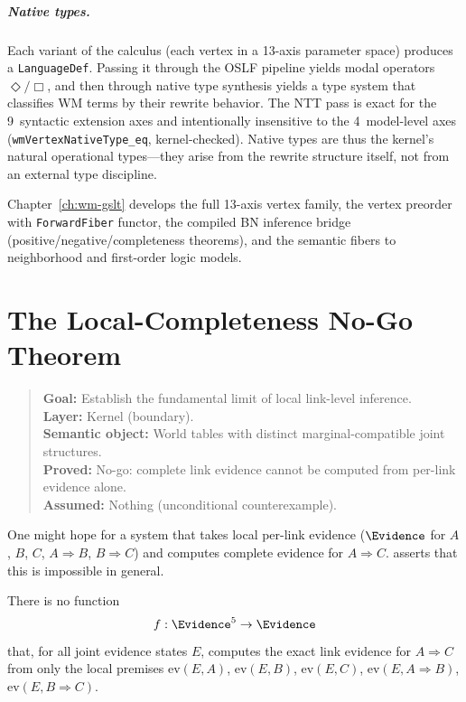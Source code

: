 \documentclass[11pt,openany]{report}
\begin{document}
\paragraph{Native types.}
Each variant of the calculus (each vertex in a 13-axis parameter space)
produces a \texttt{LanguageDef}.  Passing it through the OSLF pipeline
yields modal operators $\Diamond/\Box$, and then through native type
synthesis yields a type system that classifies WM terms by their rewrite
behavior.  The NTT pass is exact for the 9~syntactic extension axes and
intentionally insensitive to the 4~model-level axes
(\texttt{wmVertexNativeType\_eq}, kernel-checked).  Native types are thus
the kernel's natural operational types---they arise from the rewrite
structure itself, not from an external type discipline.

Chapter~\ref{ch:wm-gslt} develops the full 13-axis vertex family, the
vertex preorder with \texttt{ForwardFiber} functor, the compiled BN
inference bridge (positive/negative/completeness theorems), and the
semantic fibers to neighborhood and first-order logic models.


\chapter{The Local-Completeness No-Go Theorem}
\label{ch:no-go}

\begin{quote}\small
\textbf{Goal:} Establish the fundamental limit of local link-level inference.\\
\textbf{Layer:} Kernel (boundary).\\
\textbf{Semantic object:} World tables with distinct marginal-compatible joint structures.\\
\textbf{Proved:} No-go: complete link evidence cannot be computed from per-link evidence alone.\\
\textbf{Assumed:} Nothing (unconditional counterexample).
\end{quote}

One might hope for a system that takes local per-link evidence
($\Evidence$ for $A$, $B$, $C$, $A \Rightarrow B$, $B \Rightarrow C$)
and computes complete evidence for $A \Rightarrow C$.  \xiPLN{} asserts
that this is impossible in general.

\boundarystart
\begin{theorem}
\label{thm:no-go}
There is no function
\[
  f : \Evidence^5 \to \Evidence
\]
that, for all joint evidence states $E$, computes the exact link evidence
for $A \Rightarrow C$ from only the local premises
$\mathrm{ev}(E, A)$, $\mathrm{ev}(E, B)$, $\mathrm{ev}(E, C)$,
$\mathrm{ev}(E, A \Rightarrow B)$, $\mathrm{ev}(E, B \Rightarrow C)$.
\end{theorem}
\boundaryend
\end{document}
